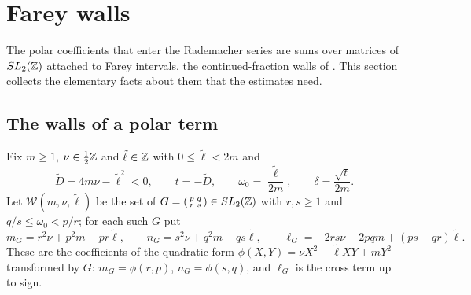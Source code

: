 \section{Farey walls}\label{sec:walls}

The polar coefficients that enter the Rademacher series are sums over matrices of $SL_2(\mathbb{Z})$ attached to Farey intervals, the continued-fraction walls of \cite{CNR21,CV08}. This section collects the elementary facts about them that the estimates need.

\subsection{The walls of a polar term}
Fix $m\ge1$, $\nu\in\frac12\mathbb{Z}$ and $\tilde\ell\in\mathbb{Z}$ with $0\le\tilde\ell<2m$ and
\[
\tilde D=4m\nu-\tilde\ell^2<0,\qquad t=-\tilde D,\qquad \omega_0=\frac{\tilde\ell}{2m},\qquad \delta=\frac{\sqrt t}{2m}.
\]
Let $\mathcal W(m,\nu,\tilde\ell)$ be the set of $G=\begin{psmallmatrix}p&q\\r&s\end{psmallmatrix}\in SL_2(\mathbb{Z})$ with $r,s\ge1$ and $q/s\le\omega_0<p/r$; for each such $G$ put
\begin{equation}\label{eq:mGnG}
m_G=r^2\nu+p^2m-pr\tilde\ell,\qquad n_G=s^2\nu+q^2m-qs\tilde\ell,\qquad \ell_G=-2rs\nu-2pqm+(ps+qr)\tilde\ell .
\end{equation}
These are the coefficients of the quadratic form $\phi(X,Y)=\nu X^2-\tilde\ell XY+mY^2$ transformed by $G$: $m_G=\phi(r,p)$, $n_G=\phi(s,q)$, and $\ell_G$ is the cross term up to sign.

